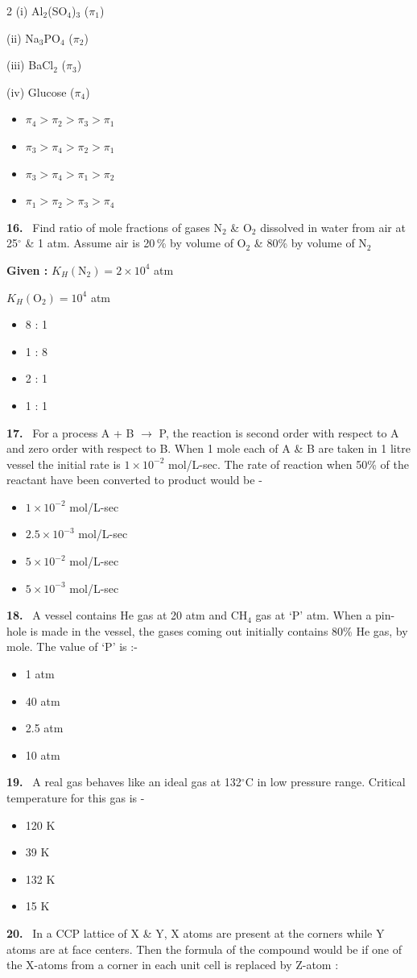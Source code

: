 \documentclass[10pt]{extarticle}
\newcommand{\qn}[1]{\par\smallskip\noindent\textbf{#1.}~}
\newenvironment{qoptions}{\begin{itemize}[leftmargin=1.8em,itemsep=1pt,topsep=2pt,label={}]}{\end{itemize}}
\newcommand{\opt}[2]{\item[(#1)] #2}
\begin{document}
\begin{multicols}{2}
(i) Al$_2$(SO$_4$)$_3$ ($\pi_1$)\par
(ii) Na$_3$PO$_4$ ($\pi_2$)\par
(iii) BaCl$_2$ ($\pi_3$)\par
(iv) Glucose ($\pi_4$)\par
[Assume 100\% ionisation of electrolytes]
\begin{qoptions}
\opt{A}{$\pi_4>\pi_2>\pi_3>\pi_1$}
\opt{B}{$\pi_3>\pi_4>\pi_2>\pi_1$}
\opt{C}{$\pi_3>\pi_4>\pi_1>\pi_2$}
\opt{D}{$\pi_1>\pi_2>\pi_3>\pi_4$}
\end{qoptions}
\qn{16} Find ratio of mole fractions of gases N$_2$ \& O$_2$ dissolved in water from air at 25$^{\circ}$ \& 1 atm. Assume air is 20\,\% by volume of O$_2$ \& 80\% by volume of N$_2$\par
\textbf{Given :} $K_H(\mathrm{N_2})=2\times10^4$ atm\par
\hspace*{3.3em}$K_H(\mathrm{O_2})=10^4$ atm
\begin{qoptions}
\opt{A}{8 : 1}
\opt{B}{1 : 8}
\opt{C}{2 : 1}
\opt{D}{1 : 1}
\end{qoptions}
\qn{17} For a process A + B $\to$ P, the reaction is second order with respect to A and zero order with respect to B. When 1 mole each of A \& B are taken in 1 litre vessel the initial rate is $1\times10^{-2}$ mol/L-sec. The rate of reaction when 50\% of the reactant have been converted to product would be -
\begin{qoptions}
\opt{A}{$1\times10^{-2}$ mol/L-sec}
\opt{B}{$2.5\times10^{-3}$ mol/L-sec}
\opt{C}{$5\times10^{-2}$ mol/L-sec}
\opt{D}{$5\times10^{-3}$ mol/L-sec}
\end{qoptions}
\qn{18} A vessel contains He gas at 20 atm and CH$_4$ gas at `P' atm. When a pin-hole is made in the vessel, the gases coming out initially contains 80\% He gas, by mole. The value of `P' is :-
\begin{qoptions}
\opt{A}{1 atm}
\opt{B}{40 atm}
\opt{C}{2.5 atm}
\opt{D}{10 atm}
\end{qoptions}
\qn{19} A real gas behaves like an ideal gas at 132$^{\circ}$C in low pressure range. Critical temperature for this gas is -
\begin{qoptions}
\opt{A}{120 K}
\opt{B}{39 K}
\opt{C}{132 K}
\opt{D}{15 K}
\end{qoptions}
\qn{20} In a CCP lattice of X \& Y, X atoms are present at the corners while Y atoms are at face centers. Then the formula of the compound would be if one of the X-atoms from a corner in each unit cell is replaced by Z-atom :

\end{multicols}
\end{document}
